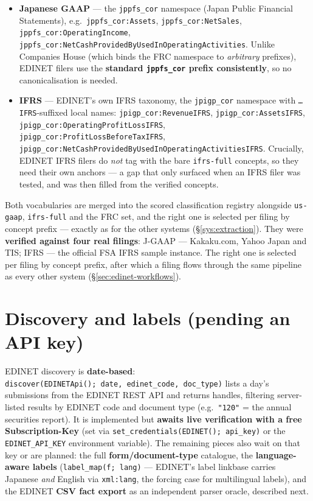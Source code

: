 \documentclass[11pt,a4paper]{report}
\begin{document}
\begin{itemize}
  \item \textbf{Japanese GAAP} --- the \texttt{jppfs\_cor} namespace (Japan Public Financial Statements),
    e.g.\ \texttt{jppfs\_cor:Assets}, \texttt{jppfs\_cor:NetSales}, \texttt{jppfs\_cor:OperatingIncome},
    \texttt{jppfs\_cor:NetCashProvidedByUsedInOperatingActivities}. Unlike Companies House (which binds the
    FRC namespace to \emph{arbitrary} prefixes), EDINET filers use the \textbf{standard \texttt{jppfs\_cor}
    prefix consistently}, so no canonicalisation is needed.
  \item \textbf{IFRS} --- EDINET's own IFRS taxonomy, the \texttt{jpigp\_cor} namespace with
    \texttt{…IFRS}-suffixed local names: \texttt{jpigp\_cor:RevenueIFRS},
    \texttt{jpigp\_cor:AssetsIFRS}, \texttt{jpigp\_cor:OperatingProfitLossIFRS},
    \texttt{jpigp\_cor:ProfitLossBeforeTaxIFRS},
    \texttt{jpigp\_cor:NetCashProvidedByUsedInOperatingActivitiesIFRS}. Crucially, EDINET IFRS filers do
    \emph{not} tag with the bare \texttt{ifrs-full} concepts, so they need their own anchors --- a gap that
    only surfaced when an IFRS filer was tested, and was then filled from the verified concepts.
\end{itemize}

\noindent Both vocabularies are merged into the scored classification registry alongside \texttt{us-gaap},
\texttt{ifrs-full} and the FRC set, and the right one is selected per filing by concept prefix --- exactly
as for the other systems (\S\ref{sys:extraction}). They were \textbf{verified against four real filings}:
J-GAAP --- Kakaku.com, Yahoo Japan and TIS; IFRS --- the official FSA IFRS sample instance. The right one is
selected per filing by concept prefix, after which a filing flows through the same pipeline as every other
system (\S\ref{sec:edinet-workflows}).

\section{Discovery and labels (pending an API key)}

EDINET discovery is \textbf{date-based}: \texttt{discover(EDINETApi();\ date,\ edinet\_code,\ doc\_type)}
lists a day's submissions from the EDINET REST API and returns handles, filtering server-listed results by
EDINET code and document type (e.g.\ \texttt{"120"} = the annual securities report). It is
implemented but \textbf{awaits live verification with a free Subscription-Key} (set via
\texttt{set\_credentials(EDINET();\ api\_key)} or the \texttt{EDINET\_API\_KEY} environment variable). The
remaining pieces also wait on that key or are planned: the full \textbf{form/document-type} catalogue, the
\textbf{language-aware labels} (\texttt{label\_map(f;\ lang)} --- EDINET's label linkbase carries Japanese
\emph{and} English via \texttt{xml:lang}, the forcing case for multilingual labels), and the EDINET
\textbf{CSV fact export} as an independent parser oracle, described next.
\end{document}
